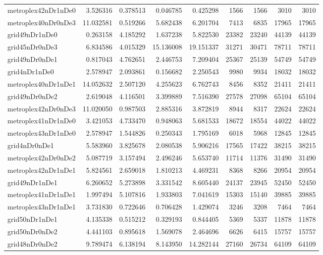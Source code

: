 \begin{longtable}{|l|r|r|r|r|r|r|r|r|}
metroplex42nDr1nDe0 & 3.526316 & 0.378513 & 0.046785 & 0.425298 & 1566 & 1566 & 3010 & 3010 \\
metroplex40nDr0nDe3 & 11.032581 & 0.519266 & 5.682438 & 6.201704 & 7413 & 6835 & 17965 & 17965 \\
grid49nDr1nDe0 & 0.263158 & 4.185292 & 1.637238 & 5.822530 & 23382 & 23240 & 44139 & 44139 \\
grid45nDr0nDe3 & 6.834586 & 4.015329 & 15.136008 & 19.151337 & 31271 & 30471 & 78711 & 78711 \\
grid49nDr0nDe1 & 0.817043 & 4.762651 & 2.446753 & 7.209404 & 25367 & 25139 & 54749 & 54749 \\
grid4nDr1nDe0 & 2.578947 & 2.093861 & 0.156682 & 2.250543 & 9980 & 9934 & 18032 & 18032 \\
metroplex40nDr1nDe1 & 14.052632 & 2.507120 & 4.255623 & 6.762743 & 8456 & 8352 & 21411 & 21411 \\
grid49nDr0nDe2 & 2.619048 & 4.116501 & 3.399889 & 7.516390 & 27578 & 27098 & 65104 & 65104 \\
metroplex42nDr0nDe3 & 11.020050 & 0.987503 & 2.885316 & 3.872819 & 8944 & 8317 & 22624 & 22624 \\
metroplex41nDr1nDe0 & 3.421053 & 4.733470 & 0.948063 & 5.681533 & 18672 & 18554 & 44022 & 44022 \\
metroplex43nDr1nDe0 & 2.578947 & 1.544826 & 0.250343 & 1.795169 & 6018 & 5968 & 12845 & 12845 \\
grid4nDr0nDe1 & 5.583960 & 3.825678 & 2.080538 & 5.906216 & 17565 & 17422 & 38215 & 38215 \\
metroplex42nDr0nDe2 & 5.087719 & 3.157494 & 2.496246 & 5.653740 & 11714 & 11376 & 31490 & 31490 \\
metroplex42nDr1nDe1 & 5.824561 & 2.659018 & 1.810213 & 4.469231 & 8368 & 8266 & 20954 & 20954 \\
grid49nDr1nDe1 & 6.260652 & 5.273898 & 3.331542 & 8.605440 & 24137 & 23945 & 52450 & 52450 \\
metroplex41nDr1nDe1 & 1.997494 & 5.107816 & 1.933803 & 7.041619 & 15303 & 15140 & 39885 & 39885 \\
metroplex43nDr1nDe1 & 3.731830 & 0.722646 & 0.706428 & 1.429074 & 3246 & 3208 & 7464 & 7464 \\
grid50nDr1nDe1 & 4.135338 & 0.515212 & 0.329193 & 0.844405 & 5369 & 5337 & 11878 & 11878 \\
grid50nDr0nDe2 & 4.441103 & 0.895618 & 1.569078 & 2.464696 & 6626 & 6415 & 15757 & 15757 \\
grid48nDr0nDe2 & 9.789474 & 6.138194 & 8.143950 & 14.282144 & 27160 & 26734 & 64109 & 64109 \\

\end{longtable}
